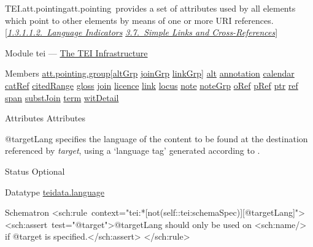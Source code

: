 \begin{reflist}
\item[]\begin{specHead}{TEI.att.pointing}{att.pointing} provides a set of attributes used by all elements which point to other elements by means of one or more URI references. [\textit{\hyperref[STGAla]{1.3.1.1.2.\ Language Indicators}} \textit{\hyperref[COXR]{3.7.\ Simple Links and Cross-References}}]\end{specHead} 
    \item[{Module}]
  tei — \hyperref[ST]{The TEI Infrastructure}
    \item[{Members}]
  \hyperref[TEI.att.pointing.group]{att.pointing.group}[\hyperref[TEI.altGrp]{altGrp} \hyperref[TEI.joinGrp]{joinGrp} \hyperref[TEI.linkGrp]{linkGrp}] \hyperref[TEI.alt]{alt} \hyperref[TEI.annotation]{annotation} \hyperref[TEI.calendar]{calendar} \hyperref[TEI.catRef]{catRef} \hyperref[TEI.citedRange]{citedRange} \hyperref[TEI.gloss]{gloss} \hyperref[TEI.join]{join} \hyperref[TEI.licence]{licence} \hyperref[TEI.link]{link} \hyperref[TEI.locus]{locus} \hyperref[TEI.note]{note} \hyperref[TEI.noteGrp]{noteGrp} \hyperref[TEI.oRef]{oRef} \hyperref[TEI.pRef]{pRef} \hyperref[TEI.ptr]{ptr} \hyperref[TEI.ref]{ref} \hyperref[TEI.span]{span} \hyperref[TEI.substJoin]{substJoin} \hyperref[TEI.term]{term} \hyperref[TEI.witDetail]{witDetail}
    \item[{Attributes}]
  Attributes\hfil\\[-10pt]\begin{sansreflist}
    \item[@targetLang]
  specifies the language of the content to be found at the destination referenced by {\itshape target}, using a ‘language tag’ generated according to .
\begin{reflist}
    \item[{Status}]
  Optional
    \item[{Datatype}]
  \hyperref[TEI.teidata.language]{teidata.language}
    \item[{Schematron}]
   <sch:rule context="tei:*[not(self::tei:schemaSpec)][@targetLang]"> <sch:assert test="@target">@targetLang should only be used on <sch:name/> if @target is specified.</sch:assert> </sch:rule>
    \item[]\mbox{}\newline 

\end{reflist}
\end{sansreflist}
\end{reflist}
